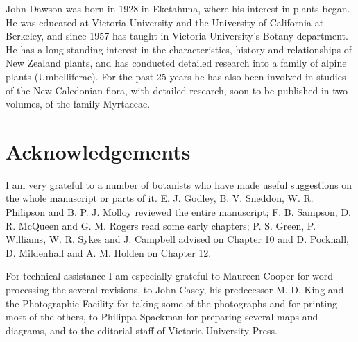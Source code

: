 John Dawson was born in 1928 in Eketahuna, where his interest in plants began.
He was educated at Victoria University and the University of California at Berkeley, and since 1957 has taught in Victoria University's Botany department.
He has a long standing interest in the characteristics, history and relationships of New Zealand plants, and has conducted detailed research into a family of alpine plants (Umbelliferae).
For the past 25 years he has also been involved in studies of the New Caledonian flora, with detailed research, soon to be published in two volumes, of the family Myrtaceae.

\chapter*{Acknowledgements}

I am very grateful to a number of botanists who have made useful suggestions on the whole manuscript or parts of it. E. J. Godley, B. V. Sneddon, W. R. Philipson and B. P. J. Molloy reviewed the entire manuscript; F. B. Sampson, D. R. McQueen and G. M. Rogers read some early chapters; P. S. Green, P. Williams, W. R. Sykes and J. Campbell advised on Chapter 10 and D. Pocknall, D. Mildenhall and A. M. Holden on Chapter 12.\par
For technical assistance I am especially grateful to Maureen Cooper for word processing the several revisions, to John Casey, his predecessor M. D. King and the Photographic Facility for taking some of the photographs and for printing most of the others, to Philippa Spackman for preparing several maps and diagrams, and to the editorial staff of Victoria University Press.
